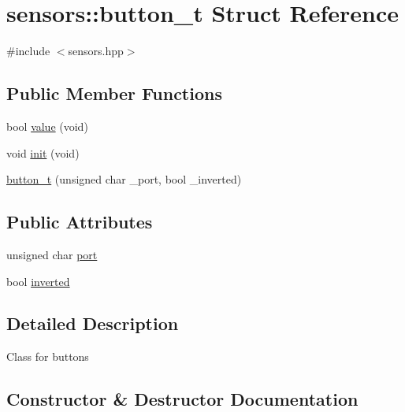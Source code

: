 \hypertarget{structsensors_1_1button__t}{}\section{sensors\+:\+:button\+\_\+t Struct Reference}
\label{structsensors_1_1button__t}


{\ttfamily \#include $<$sensors.\+hpp$>$}

\subsection*{Public Member Functions}
\begin{DoxyCompactItemize}
\item 
bool \hyperlink{structsensors_1_1button__t_a3a8a49bbe489984f30f78d53ba5a1372}{value} (void)
\item 
void \hyperlink{structsensors_1_1button__t_a1b5fc93672ca08665b8d8c6664131d1f}{init} (void)
\item 
\hyperlink{structsensors_1_1button__t_aff6770444274fb81953b0e6b6b864f38}{button\+\_\+t} (unsigned char \+\_\+port, bool \+\_\+inverted)
\end{DoxyCompactItemize}
\subsection*{Public Attributes}
\begin{DoxyCompactItemize}
\item 
unsigned char \hyperlink{structsensors_1_1button__t_ad100f6e3b4333b9271e597d940e18852}{port}
\item 
bool \hyperlink{structsensors_1_1button__t_a9d219ff98b6f74e5f4fcbd987f419484}{inverted}
\end{DoxyCompactItemize}


\subsection{Detailed Description}
Class for buttons 

\subsection{Constructor \& Destructor Documentation}
\mbox{\label{structsensors_1_1button__t_aff6770444274fb81953b0e6b6b864f38}} 
